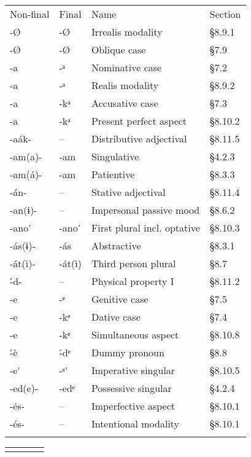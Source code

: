\begin{table}
\begin{table}
\begin{tabularx}{\textwidth}{XXXX}
Non-final & Final & Name & Section\\
{}-Ø & {}-Ø & Irrealis modality & §8.9.1\\
{}-Ø & {}-Ø & Oblique case & §7.9\\
{}-a & {}-ᵃ & Nominative case & §7.2\\
{}-a & {}-ᵃ & Realis modality & §8.9.2\\
{}-a & {}-kᵃ & Accusative case & §7.3\\
{}-a & {}-kᵃ & Present perfect aspect & §8.10.2\\
{}-aák- & – & Distributive adjectival & §8.11.5\\
{}-am(a)- & {}-am & Singulative & §4.2.3\\
{}-am(á)- & {}-am & Patientive & §8.3.3\\
{}-án- & – & Stative adjectival & §8.11.4\\
{}-an(ɨ)- & – & Impersonal passive mood & §8.6.2\\
{}-ano\'{ } & {}-ano\'{ } & First plural incl. optative & §8.10.3\\
{}-ás(ɨ)- & {}-ás & Abstractive & §8.3.1\\
{}-át(ì)- & {}-át(ì) & Third person plural & §8.7\\
{}\'{-}d- & – & Physical property I & §8.11.2\\
{}-e & {}-ᵉ & Genitive case & §7.5\\
{}-e & {}-kᵉ & Dative case & §7.4\\
{}-e & {}-kᵉ & Simultaneous aspect & §8.10.8\\
{}\'{-}è & {}\'{-}dᵉ & Dummy pronoun & §8.8\\
{}-e\'{ } & {}-ᵉ\'{ } & Imperative singular & §8.10.5\\
{}-ed(e)- & {}-edᵉ & Possessive singular & §4.2.4\\
{}-és- & – & Imperfective aspect & §8.10.1\\
{}-és- & – & Intentional modality & §8.10.1\\
\lspbottomrule
\end{tabularx} 

\end{table}


\begin{tabularx}{\textwidth}{XXXX}
\lsptoprule


\end{tabularx}
\end{table}
